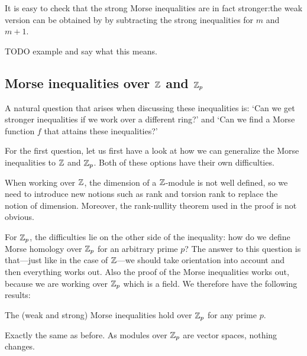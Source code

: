 It is easy to check that the strong Morse inequalities are in fact stronger:the weak version can be obtained by by subtracting the strong inequalities for $m$ and  $m+1$.



\begin{eg}
    TODO example and say what this means.
\end{eg}

\subsection{Morse inequalities over $\mathbb{Z}$ and $\mathbb{Z}_p$}

A natural question that arises when discussing these inequalities is: `Can we get stronger inequalities if we work over a different ring?' and `Can we find a Morse function $f$ that attains these inequalities?'

For the first question, let us first have a look at how we can generalize the Morse inequalities to $\mathbb{Z}$ and $\mathbb{Z}_p$.
Both of these options have their own difficulties.

When working over $\mathbb{Z}$, the dimension of a $\mathbb{Z}$-module is not well defined, so we need to introduce new notions such as rank and torsion rank to replace the notion of dimension. Moreover, the rank-nullity theorem used in the proof is not obvious.

For $\mathbb{Z}_p$, the difficulties lie on the other side of the inequality: how do we define Morse homology over $\mathbb{Z}_p$ for an arbitrary prime $p$?
The answer to this question is that---just like in the case of $\mathbb{Z}$---we should take orientation into account and then everything works out.
Also the proof of the Morse inequalities works out, because we are working over $\mathbb{Z}_p$ which is a field. We therefore have the following results:

\begin{theorem}
    The (weak and strong) Morse inequalities hold over $\mathbb{Z}_p$ for any prime $p$.
\end{theorem}
\begin{myproof}
    Exactly the same as before. As modules over $\mathbb{Z}_p$ are vector spaces, nothing changes.
\end{myproof}

